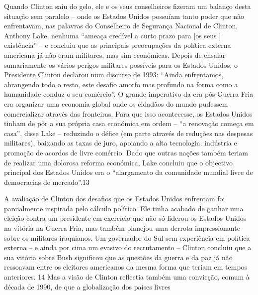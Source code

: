 Quando Clinton saiu do gelo, ele e os seus conselheiros fizeram um balanço desta situação sem paralelo – onde os Estados Unidos possuíam tanto poder que não enfrentavam, nas palavras do Conselheiro de Segurança Nacional de Clinton, Anthony Lake, nenhuma “ameaça credível a curto prazo para [os seus ] existência” – e concluiu que as principais preocupações da política externa americana já não eram militares, mas sim económicas. Depois de ensaiar sumariamente os vários perigos militares possíveis para os Estados Unidos, o Presidente Clinton declarou num discurso de 1993: “Ainda enfrentamos, abrangendo todo o resto, este desafio amorfo mas profundo na forma como a humanidade conduz o seu comércio”. O grande imperativo da era pós-Guerra Fria era organizar uma economia global onde os cidadãos do mundo pudessem comercializar através das fronteiras. Para que isso acontecesse, os Estados Unidos tinham de pôr a sua própria casa económica em ordem – “a renovação começa em casa”, disse Lake – reduzindo o défice (em parte através de reduções nas despesas militares), baixando as taxas de juro, apoiando a alta tecnologia. indústria e promoção de acordos de livre comércio. Dado que outras nações também teriam de realizar uma dolorosa reforma económica, Lake concluiu que o objectivo principal dos Estados Unidos era o “alargamento da comunidade mundial livre de democracias de mercado”.{\color{blue}13}
 \par 
A avaliação de Clinton dos desafios que os Estados Unidos enfrentam foi parcialmente inspirada pelo cálculo político. Ele tinha acabado de ganhar uma eleição contra um presidente em exercício que não só liderou os Estados Unidos na vitória na Guerra Fria, mas também planejou uma derrota impressionante sobre os militares iraquianos. Um governador do Sul sem experiência em política externa – e ainda por cima um evasivo do recrutamento – Clinton concluiu que a sua vitória sobre Bush significou que as questões da guerra e da paz já não ressoavam entre os eleitores americanos da mesma forma que teriam em tempos anteriores. {\color{blue}14} Mas a visão de Clinton reflectia também uma convicção, comum à década de 1990, de que a globalização dos países livres
 \par 
